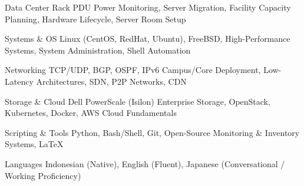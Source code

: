 

\begin{cvskills}

  \cvskill
    {Data Center} %
    {Rack PDU Power Monitoring, Server Migration, Facility Capacity Planning, Hardware Lifecycle, Server Room Setup} %

  \cvskill
    {Systems \& OS} %
    {Linux (CentOS, RedHat, Ubuntu), FreeBSD, High-Performance Systems, System Administration, Shell Automation} %

  \cvskill
    {Networking} %
    {TCP/UDP, BGP, OSPF, IPv6 Campus/Core Deployment, Low-Latency Architectures, SDN, P2P Networks, CDN} %

  \cvskill
    {Storage \& Cloud} %
    {Dell PowerScale (Isilon) Enterprise Storage, OpenStack, Kubernetes, Docker, AWS Cloud Fundamentals} %

  \cvskill
    {Scripting \& Tools} %
    {Python, Bash/Shell, Git, Open-Source Monitoring \& Inventory Systems, LaTeX} %

  \cvskill
    {Languages} %
    {Indonesian (Native), English (Fluent), Japanese (Conversational / Working Proficiency)} %

\end{cvskills}
